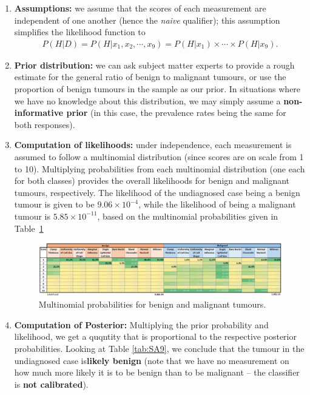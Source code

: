 \begin{enumerate}[noitemsep]
    \item \textbf{Assumptions:} we assume that the scores of each measurement are independent of one another (hence the \textit{naive} qualifier); this assumption simplifies the likelihood function to
    \begin{align*}
        P(H|D)=P(H|x_{1},x_{2},\cdots,x_{9})=P(H|x_{1})\times \cdots\times P(H|x_{9}).
    \end{align*}
    \item \textbf{Prior distribution:} we can ask subject matter experts to provide a rough estimate for the general ratio of benign to malignant tumours, or use the proportion of benign tumours in the sample as our prior. In situations where we have no knowledge about this distribution, we may simply assume a \textbf{non-informative prior} (in this case, the prevalence rates being the same for both responses). 
    
    \item \textbf{Computation of likelihoods:} under independence, each measurement is assumed to follow a multinomial distribution (since scores are on scale from 1 to 10). Multiplying probabilities from each multinomial distribution (one each for both classes) provides the overall likelihoods for benign and malignant tumours, respectively. The likelihood of the undiagnosed case being a benign tumour is given to be $9.06\times 10^{-4}$, while the likelihood of being a malignant tumour is $5.85\times 10^{-11}$, based on the multinomial probabilities given in Table~\ref{fig:testA13}
    
    \begin{figure}[!t]
    \centering
      \includegraphics[width=1\linewidth]{Images/testA13.png}
      \caption[\small Multinomial probabilities for benign and malignant tumours]{\small Multinomial probabilities for benign and malignant tumours.}
      \label{fig:testA13}
    \end{figure}
    
    
    \item \textbf{Computation of Posterior:} Multiplying the prior probability and likelihood, we get a quqntity that is proportional to the respective posterior probabilities. Looking at Table \ref{tab:SA9}, we conclude that the tumour in the undiagnosed case is\textbf{likely benign} (note that we have no measurement on how much more likely it is to be benign than to be malignant -- the classifier is \textbf{not calibrated}).
    

\end{enumerate}
